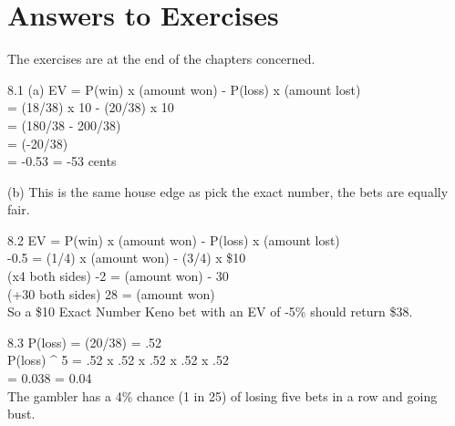 \chapter{Answers to Exercises}

The exercises are at the end of the chapters concerned.

8.1 (a) EV = P(win) x (amount won) - P(loss) x (amount lost) \\
= (18/38) x 10 - (20/38) x 10 \\
= (180/38 - 200/38) \\
= (-20/38) \\
= -0.53 = -53 cents

(b) This is the same house edge as pick the exact number, the bets are
equally fair.

8.2 EV = P(win) x (amount won) - P(loss) x (amount lost) \\
-0.5  = (1/4)  x (amount won) - (3/4) x \$10 \\
(x4 both sides) -2 = (amount won) - 30 \\
(+30 both sides) 28 = (amount won) \\

So a \$10 Exact Number Keno bet with an EV of -5\% should return
\$38.

8.3 P(loss) = (20/38) = .52 \\
P(loss) ^ 5 = .52 x .52 x .52 x .52 x .52 \\
= 0.038 = 0.04 \\

The gambler has a 4\% chance (1 in 25) of losing five bets in a row
and going bust.

